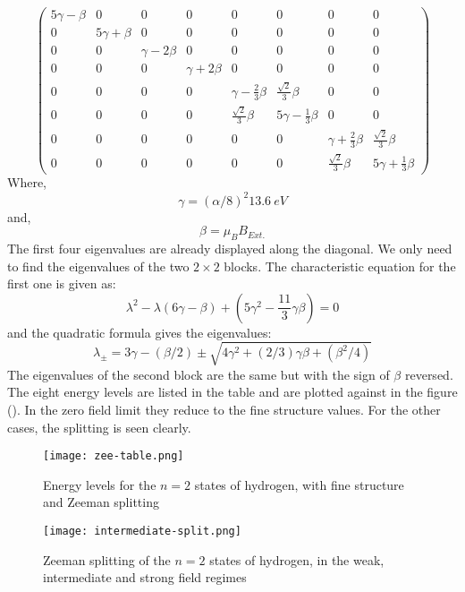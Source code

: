 \begin{equation}
\begin{pmatrix}
5 \gamma - \beta & 0 & 0 & 0 & 0 & 0 & 0 & 0 \\
0 & 5 \gamma + \beta & 0 & 0 & 0 & 0 & 0 & 0\\
0 & 0 & \gamma - 2 \beta & 0 & 0 & 0 & 0 & 0\\
0 & 0 & 0 & \gamma + 2 \beta & 0 & 0 & 0 & 0\\
0 & 0 & 0 & 0 & \gamma - \frac{2}{3} \beta & \frac{\sqrt{2}}{3} \beta & 0 & 0\\
0 & 0 & 0 & 0 & \frac{\sqrt{2}}{3} \beta & 5 \gamma - \frac{1}{3} \beta & 0 & 0\\
0 & 0 & 0 & 0 & 0 & 0 & \gamma + \frac{2}{3} \beta & \frac{\sqrt{2}}{3} \beta\\
0 & 0 & 0 & 0 & 0 & 0 & \frac{\sqrt{2}}{3} \beta & 5 \gamma + \frac{1}{3} \beta
\end{pmatrix}
\end{equation}
Where,
$$\gamma = {(\alpha / 8)}^{2}13.6 \ eV$$
and,
$$\beta = \mu_{B}B_{Ext.}$$
The first four eigenvalues are already displayed along the diagonal. We only need to find the eigenvalues of the two  $2 \times 2$ blocks. The characteristic equation for the first one is given as:
\begin{equation}
	\lambda^{2} - \lambda(6\gamma - \beta) + \left(5 \gamma^{2} - \frac{11}{3} \gamma \beta\right) = 0
\end{equation} 
and the quadratic formula gives the eigenvalues:
\begin{equation}
\lambda_{\pm} = 3 \gamma - (\beta /2) \pm \sqrt{4 \gamma^{2} + (2/3) \gamma \beta + (\beta^{2}/4)} 
\end{equation}
The eigenvalues of the second block are the same but with the sign of $\beta$ reversed. The eight energy levels are listed in the table and are plotted against in the figure (). In the zero field limit they reduce to the fine structure values. For the other cases, the splitting is seen clearly.
\begin{figure}[h]
	\centering
	\texttt{[image: zee-table.png]}
	\caption{Energy levels for the $n=2$ states of hydrogen, with fine structure and Zeeman splitting}
\end{figure}
\begin{figure}[h]
	\centering
	\texttt{[image: intermediate-split.png]}
	\caption{Zeeman splitting of the $n = 2$ states of hydrogen, in the weak, intermediate and strong field regimes}
\end{figure}
